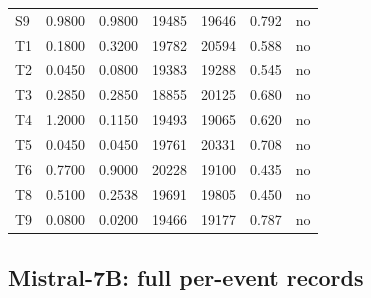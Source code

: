 \begin{table}[!htbp]
\begin{tabular}{lrrrrrl}
S9 & 0.9800 & 0.9800 & 19485 & 19646 & 0.792 & no \\
T1 & 0.1800 & 0.3200 & 19782 & 20594 & 0.588 & no \\
T2 & 0.0450 & 0.0800 & 19383 & 19288 & 0.545 & no \\
T3 & 0.2850 & 0.2850 & 18855 & 20125 & 0.680 & no \\
T4 & 1.2000 & 0.1150 & 19493 & 19065 & 0.620 & no \\
T5 & 0.0450 & 0.0450 & 19761 & 20331 & 0.708 & no \\
T6 & 0.7700 & 0.9000 & 20228 & 19100 & 0.435 & no \\
T8 & 0.5100 & 0.2538 & 19691 & 19805 & 0.450 & no \\
T9 & 0.0800 & 0.0200 & 19466 & 19177 & 0.787 & no \\
\bottomrule
\end{tabular}
\end{table}


\clearpage\subsection{Mistral-7B: full per-event records}

